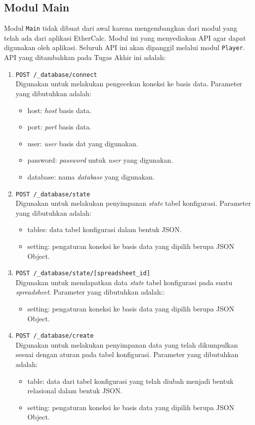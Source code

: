 	\subsection{Modul Main}
	Modul \texttt{Main} tidak dibuat dari awal karena mengembangkan dari modul yang telah ada dari aplikasi EtherCalc. Modul ini yang menyediakan API agar dapat digunakan oleh aplikasi. Seluruh API ini akan dipanggil melalui modul \texttt{Player}. API yang ditambahkan pada Tugas Akhir ini adalah:
	\begin{enumerate}
		\item \texttt{POST /\_database/connect} \\
		Digunakan untuk melakukan pengecekan koneksi ke basis data. Parameter yang dibutuhkan adalah:
		\begin{itemize} 
			\item host: \textit{host} basis data.
			\item port: \textit{port} basis data.
			\item user: \textit{user} basis dat yang digunakan.
			\item password: \textit{password} untuk \textit{user} yang digunakan.
			\item database: nama \textit{database} yang digunakan.
		\end{itemize}
	
		\item \texttt{POST /\_database/state} \\
		Digunakan untuk melakukan penyimpanan \textit{state} tabel konfigurasi. Parameter yang dibutuhkan adalah:
		\begin{itemize} 
			\item tables: data tabel konfigurasi dalam bentuk JSON.
			\item setting: pengaturan koneksi ke basis data yang dipilih berupa JSON Object.
		\end{itemize}

		\item \texttt{POST /\_database/state/[spreadsheet\_id]} \\
		Digunakan untuk mendapatkan data \textit{state} tabel konfigurasi pada suatu \textit{spreadsheet}. Parameter yang dibutuhkan adalah::
		\begin{itemize}
			\item setting: pengaturan koneksi ke basis data yang dipilih berupa JSON Object.
		\end{itemize}

		\item \texttt{POST /\_database/create} \\
		Digunakan untuk melakukan penyimpanan data yang telah dikumpulkan sesuai dengan aturan pada tabel konfigurasi. Parameter yang dibutuhkan adalah:
		\begin{itemize} 
			\item table: data dari tabel konfigurasi yang telah diubah menjadi bentuk relasional dalam bentuk JSON.
			\item setting: pengaturan koneksi ke basis data yang dipilih berupa JSON Object.
		\end{itemize}
	

\end{enumerate}
